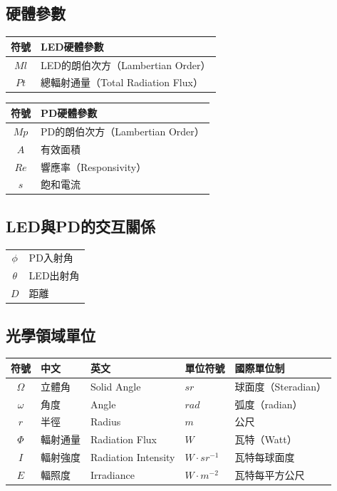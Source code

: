 \onehalfspacing

\subsection*{硬體參數}

\begin{longtable}[l]{cl}
    符號 & LED硬體參數\\ \hline
    $Ml$ & LED的朗伯次方（Lambertian Order）\\
    $Pt$ & 總輻射通量（Total Radiation Flux） 
\end{longtable}

\begin{longtable}[l]{cl}
    符號 & PD硬體參數\\ \hline
    $Mp$ & PD的朗伯次方（Lambertian Order）\\
    $A$ & 有效面積\\
    $Re$ & 響應率（Responsivity）\\
    $s$ &飽和電流
\end{longtable}


\onehalfspacing

\subsection*{LED與PD的交互關係}

\begin{longtable}[l]{cl}
    $\phi$ & PD入射角\\
    $\theta$ & LED出射角\\
    $D$&距離\\
\end{longtable}

\onehalfspacing

\subsection*{光學領域單位}

\begin{longtable}[l]{cllll}
    符號& 中文& 英文 & 單位符號&國際單位制\\\hline
    $\Omega$ & 立體角&Solid Angle& $sr$&球面度（Steradian） \\
    $\omega$ & 角度&Angle& $rad$&弧度（radian）\\
    $r$ & 半徑&Radius&  $m$ &公尺\\
    $\Phi$ & 輻射通量&Radiation Flux& $W$&瓦特（Watt）\\
    $I$ & 輻射強度&Radiation Intensity & $W\cdot sr^{-1}$&瓦特每球面度 \\
    $E$ & 輻照度&Irradiance&$W\cdot m^{-2}$ &瓦特每平方公尺\\
\end{longtable}


